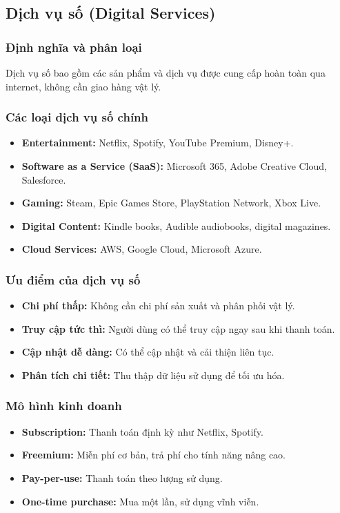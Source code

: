 \documentclass[a4paper,12pt]{report}
\begin{document}
\subsection{Dịch vụ số (Digital Services)}

\subsubsection{Định nghĩa và phân loại}
Dịch vụ số bao gồm các sản phẩm và dịch vụ được cung cấp hoàn toàn qua internet, không cần giao hàng vật lý.

\subsubsection{Các loại dịch vụ số chính}
\begin{itemize}
    \item \textbf{Entertainment:} Netflix, Spotify, YouTube Premium, Disney+.
    \item \textbf{Software as a Service (SaaS):} Microsoft 365, Adobe Creative Cloud, Salesforce.
    \item \textbf{Gaming:} Steam, Epic Games Store, PlayStation Network, Xbox Live.
    \item \textbf{Digital Content:} Kindle books, Audible audiobooks, digital magazines.
    \item \textbf{Cloud Services:} AWS, Google Cloud, Microsoft Azure.
\end{itemize}

\subsubsection{Ưu điểm của dịch vụ số}
\begin{itemize}
    \item \textbf{Chi phí thấp:} Không cần chi phí sản xuất và phân phối vật lý.
    \item \textbf{Truy cập tức thì:} Người dùng có thể truy cập ngay sau khi thanh toán.
    \item \textbf{Cập nhật dễ dàng:} Có thể cập nhật và cải thiện liên tục.
    \item \textbf{Phân tích chi tiết:} Thu thập dữ liệu sử dụng để tối ưu hóa.
\end{itemize}

\subsubsection{Mô hình kinh doanh}
\begin{itemize}
    \item \textbf{Subscription:} Thanh toán định kỳ như Netflix, Spotify.
    \item \textbf{Freemium:} Miễn phí cơ bản, trả phí cho tính năng nâng cao.
    \item \textbf{Pay-per-use:} Thanh toán theo lượng sử dụng.
    \item \textbf{One-time purchase:} Mua một lần, sử dụng vĩnh viễn.
\end{itemize}
\end{document}
